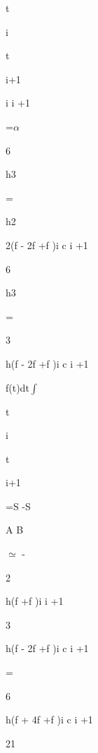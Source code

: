 t\par
i\par
t\par
i+1\par
i i +1\par
=$\alpha$\par
6\par
h3\par
=\par
h2\par
2(f  - 2f  +f  )i c i +1\par
6\par
h3\par
=\par
3\par
h(f  - 2f  +f  )i c i +1\par
f(t)dt$\int$\par
t\par
i\par
t\par
i+1\par
=S  -S\par
A B\par
$\simeq$  -\par
2\par
h(f  +f  )i i +1\par
3\par
h(f  - 2f  +f  )i c i +1\par
=\par
6\par
h(f  + 4f  +f  )i c i +1\par
21\par

